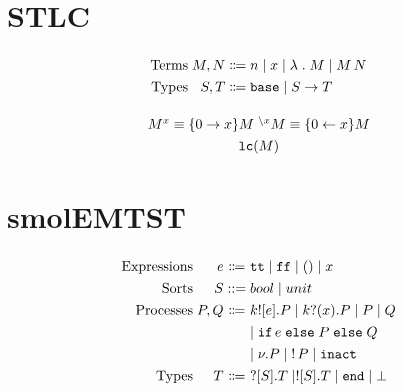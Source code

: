 \documentclass{article}
\newcommand{\withcolor}[2]{#2} %
\newcommand{\withcolor}[2]{\colorlet{currbkp}{.}\color{#1}{#2}\color{currbkp}}
\newcommand{\bnfas}{\mathrel{\Coloneqq}}
\newcommand{\bnfalt}{\mathrel{\mid}}
\newcommand{\colorex}{teal} %
\newcommand{\colorproc}{blue} %
\newcommand{\colorexp}{teal} %
\newcommand{\colorte}{purple} %
\newcommand{\colorst}{Maroon}%
\newcommand{\vex}[1]{\withcolor{\colorex}{#1}} %
\newcommand{\dexp}[1]{\withcolor{\colorexp}{#1}} %
\newcommand{\dte}[1]{\withcolor{\colorte}{#1}} %
\newcommand{\dproc}[1]{\withcolor{\colorproc}{#1}} %
\newcommand{\dst}[1]{\withcolor{\colorst}{#1}} %
\newcommand{\bvar}[1]{\ensuremath{\dexp{#1}}}
\newcommand{\fvar}[1]{\ensuremath{\dexp{#1}}}
\newcommand{\lam}[1]{\ensuremath{\dexp{\lambda\mathrel{.}{#1}}}}
\newcommand{\app}[2]{\ensuremath{\dexp{#1}\,\dexp{#2}}}
\newcommand{\base}[0]{\ensuremath{\dte{\texttt{base}}}}
\newcommand{\arr}[2]{\ensuremath{\dte{{#1}\to{#2}}}}
\newcommand{\oft}{\ensuremath{\mathrel{:}}} %
\newcommand{\lclosed}[1]{\ensuremath{\texttt{lc}({#1})}}
\newcommand{\loft}[3]{\ensuremath{\vex{#1}\mathrel{\vdash}{\dexp{#2}}\mathrel{:}{\dte{#3}}}}
\newcommand{\openop}[2]{\ensuremath{{#1}^{#2}}} %
\newcommand{\closeop}[2]{^{\backslash #2}\ensuremath{{#1}}} %
\newcommand{\ett}{\ensuremath{\dexp{\texttt{tt}}}}
\newcommand{\eff}{\ensuremath{\dexp{\texttt{ff}}}}
\newcommand{\eone}{\ensuremath{\dexp{()}}}
\newcommand{\tbool}{\ensuremath{\dte{bool}}}
\newcommand{\tunit}{\ensuremath{\dte{unit}}}
\newcommand{\psend}[3]{\ensuremath{\dproc{{#1}![\dexp{#2}].{#3}}}}
\newcommand{\precv}[3]{\ensuremath{\dproc{{#1}?(\dexp{#2}).{#3}}}}
\newcommand{\pif}[3]{\ensuremath{\dproc{
      \texttt{if}\,\dexp{#1}\mathrel{\texttt{else}}{#2}\mathrel{\texttt{else}}{#3}}}}
\newcommand{\ppar}[2]{\ensuremath{{\dproc{{#1}\mathrel{|}{#2}}}}}
\newcommand{\pnu}[1]{\ensuremath{{\dproc{\nu.{#1}}}}}
\newcommand{\pbang}[1]{\ensuremath{{\dproc{!\,{#1}}}}}
\newcommand{\pinact}[0]{\ensuremath{\dproc{\texttt{inact}}}}
\newcommand{\tin}[2]{\ensuremath\dst{?[\dte{#1}].{#2}}}
\newcommand{\tout}[2]{\ensuremath\dst{![\dte{#1}].{#2}}}
\newcommand{\tend}[0]{\ensuremath\dst{\texttt{end}}}
\newcommand{\tbot}[0]{\ensuremath\dst{\bot}}
\begin{document}
\section{STLC}

\begin{displaymath}
  \arraycolsep=1.4pt\def\arraystretch{1.3}
  \begin{array}{rrcl}
    \text{Terms} & \dexp M, \dexp N & \bnfas & \bvar n \bnfalt \fvar x \bnfalt \lam M \bnfalt \app M N\\
    \text{Types} & \dte S, \dte T & \bnfas & \base \bnfalt \arr S T\\
  \end{array}
\end{displaymath}


\begin{displaymath}
  \arraycolsep=1.4pt\def\arraystretch{1.3}
  \begin{array}{cc}
    \openop {\dexp M} {\vex x} \equiv \{\vex 0 \rightarrow \vex x\} M & \closeop {\dexp M} {\vex x} \equiv \{\vex 0 \leftarrow \vex x\} \dexp M \\
    \multicolumn{2}{c}{\lclosed {\dexp M}}\\
  \end{array}
\end{displaymath}



\section{smolEMTST}

\begin{displaymath}
  \arraycolsep=1.4pt\def\arraystretch{1.3}
  \begin{array}{rrcl}
    \text{Expressions} & \dexp{e} & \bnfas & \ett \bnfalt \eff \bnfalt \eone \bnfalt x\\
    \text{Sorts} & \dte{S} & \mathrel{::=} & \tbool \bnfalt \tunit \\

    \text{Processes} & \dproc{P}, \dproc{Q} & \bnfas & \psend k e P \bnfalt \precv k x P \bnfalt \ppar P Q\\
    & & & \bnfalt \pif e P Q \\
    & & & \bnfalt \pnu P \bnfalt \pbang P \bnfalt \pinact\\
    \text{Types} & \dst{T} & \bnfas & \tin S T \bnfalt \tout S T \bnfalt \tend \bnfalt \tbot\\
  \end{array}
\end{displaymath}
\end{document}
